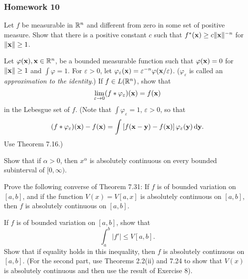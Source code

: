 \subsubsection{Homework 10}
\begin{problem}
  Let $f$ be measurable in $\mathbb{R}^n$ and different from zero in some set of
  positive measure. Show that there is a positive constant $c$ such that
  $f^*(\mathbf{x})\geq c\|\mathbf{x}\|^{-n}$ for $\|\mathbf{x}\|\geq 1$.
\end{problem}
\begin{solution}
\end{solution}

\begin{problem}
  Let $\varphi(\mathbf{x}),\mathbf{x}\in\mathbb{R}^n$, be a bounded measurable function such
  that $\varphi(\mathbf{x})=0$ for $\|\mathbf{x}\|\geq 1$ and $\int\varphi=1$. For
  $\varepsilon>0$, let
  $\varphi_\varepsilon(\mathbf{x})=\varepsilon^{-n}\varphi(\mathbf{x}/\varepsilon)$.
  ($\varphi_\varepsilon$ is called an \emph{approximation to the
    identity}.) If $f\in L(\mathbb{R}^n)$, show that
  \[
    \lim_{\varepsilon\to 0}(f*\varphi_\varepsilon)(\mathbf{x})=f(\mathbf{x})
  \]
  in the Lebesgue set of $f$. (Note that $\int\varphi_\varepsilon=1$,
  $\varepsilon>0$, so that
  \[
    (f*\varphi_\varepsilon)(\mathbf{x})-f(\mathbf{x})=\int\left[f(\mathbf{x}-\mathbf{y})-f(\mathbf{x})\right]\varphi_\varepsilon(\mathbf{y})\mathop{}\!\mathrm{d}\mathbf{y}.
  \]
  Use Theorem 7.16.)
\end{problem}
\begin{solution}
\end{solution}

\begin{problem}
  Show that if $\alpha>0$, then $x^\alpha$ is absolutely continuous on
  every bounded subinterval of $[0,\infty)$.
\end{problem}
\begin{solution}
\end{solution}

\begin{problem}
  Prove the following converse of Theorem 7.31: If $f$ is of bounded
  variation on $[a,b]$, and if the function $V(x)=V[a,x]$ is absolutely
  continuous on $[a,b]$, then $f$ is absolutely continuous on $[a,b]$.
\end{problem}
\begin{solution}
\end{solution}

\begin{problem}
  If $f$ is of bounded variation on $[a,b]$, show that
  \[
    \int_a^b|f'|\leq V[a,b].
  \]
  Show that if equality holds in this inequality, then $f$ is absolutely
  continuous on $[a,b]$. (For the second part, use Theorems 2.2(ii) and
  7.24 to show that $V(x)$ is absolutely continuous and then use the result
  of Exercise 8).
\end{problem}
\begin{solution}
\end{solution}

